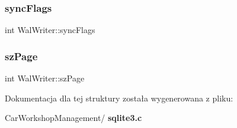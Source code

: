 \mbox{\label{struct_wal_writer_acc8dcbdc9b91bae4799b5de113742ae6}} 
\subsubsection{syncFlags}
{\footnotesize\ttfamily int Wal\+Writer\+::sync\+Flags}

\mbox{\label{struct_wal_writer_aa161832c97830aed52410747ebde5e6e}} 
\subsubsection{szPage}
{\footnotesize\ttfamily int Wal\+Writer\+::sz\+Page}



Dokumentacja dla tej struktury została wygenerowana z pliku\+:\begin{DoxyCompactItemize}
\item 
Car\+Workshop\+Management/\textbf{ sqlite3.\+c}\end{DoxyCompactItemize}
